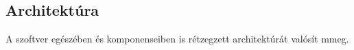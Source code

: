 \subsection{Architektúra}

A szoftver egészében és komponenseiben is rétzegzett architektúrát valósít mmeg.


